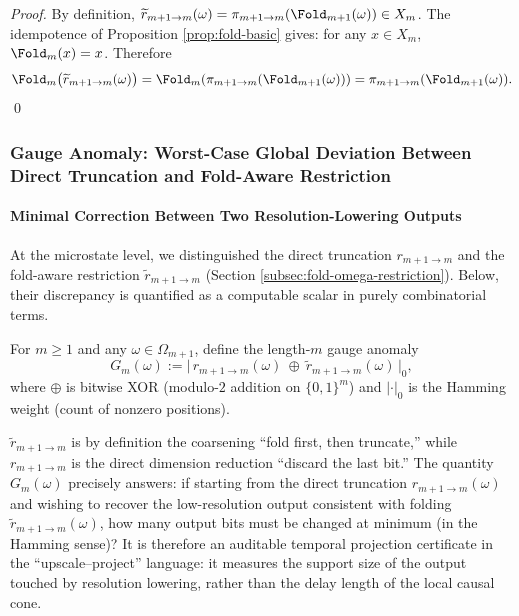 \begin{proof}
By definition, $\widetilde r_{m+1\to m}(\omega)=\pi_{m+1\to m}(\Fold_{m+1}(\omega))\in X_m$. The idempotence of Proposition \ref{prop:fold-basic} gives: for any $x\in X_m$, $\Fold_m(x)=x$. Therefore
\[
\Fold_m\bigl(\widetilde r_{m+1\to m}(\omega)\bigr)
=\Fold_m\!\left(\pi_{m+1\to m}(\Fold_{m+1}(\omega))\right)
=\pi_{m+1\to m}(\Fold_{m+1}(\omega)).
\]
\qed
\end{proof}

\subsubsection{Gauge Anomaly: Worst-Case Global Deviation Between Direct Truncation and Fold-Aware Restriction}\label{subsec:fold-gauge-anomaly}
\paragraph{Minimal Correction Between Two Resolution-Lowering Outputs}
At the microstate level, we distinguished the direct truncation \(r_{m+1\to m}\) and the fold-aware restriction \(\widetilde r_{m+1\to m}\) (Section \ref{subsec:fold-omega-restriction}).
Below, their discrepancy is quantified as a computable scalar in purely combinatorial terms.

\begin{definition}\label{def:fold-gauge-anomaly}
For \(m\ge 1\) and any \(\omega\in\Omega_{m+1}\), define the length-\(m\) gauge anomaly
$$
G_m(\omega)
:=\bigl|\,r_{m+1\to m}(\omega)\ \oplus\ \widetilde r_{m+1\to m}(\omega)\,\bigr|_0,
$$
where \(\oplus\) is bitwise XOR (modulo-$2$ addition on \(\{0,1\}^m\)) and \(|\cdot|_0\) is the Hamming weight (count of nonzero positions).
\end{definition}

\begin{remark}
\(\widetilde r_{m+1\to m}\) is by definition the coarsening ``fold first, then truncate,'' while \(r_{m+1\to m}\) is the direct dimension reduction ``discard the last bit.''
The quantity \(G_m(\omega)\) precisely answers: if starting from the direct truncation \(r_{m+1\to m}(\omega)\) and wishing to recover the low-resolution output consistent with folding \(\widetilde r_{m+1\to m}(\omega)\), how many output bits must be changed at minimum (in the Hamming sense)?
It is therefore an auditable temporal projection certificate in the ``upscale--project'' language: it measures the support size of the output touched by resolution lowering, rather than the delay length of the local causal cone.
\end{remark}


